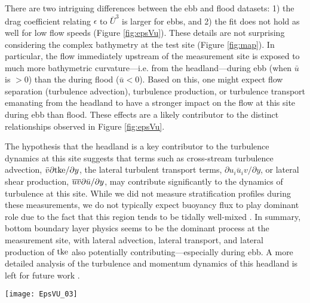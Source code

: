 There are two intriguing differences between the ebb and flood datasets: 1) the drag coefficient relating $\epsilon$ to $\bar{U}^3$ is larger for ebbs, and 2) the fit does not hold as well for low flow speeds (Figure \ref{fig:epsVu}). These details are not surprising considering the complex bathymetry at the test site (Figure \ref{fig:map}). In particular, the flow immediately upstream of the measurement site is exposed to much more bathymetric curvature---i.e. from the headland---during ebb (when $\bar{u}$ is $>0$) than the during flood ($\bar{u}<0$). Based on this, one might expect flow separation (turbulence advection), turbulence production, or turbulence transport emanating from the headland to have a stronger impact on the flow at this site during ebb than flood. These effects are a likely contributor to the distinct relationships observed in Figure \ref{fig:epsVu}. 

The hypothesis that the headland is a key contributor to the turbulence dynamics at this site suggests that terms such as cross-stream turbulence advection, $\bar{v}\partial \mathrm{tke} / \partial y$, the lateral turbulent transport terms, $\partial \overline{u_iu_i v} / \partial y$, or lateral shear production, $\overline{uv}\partial \bar{u} / \partial y$, may contribute significantly to the dynamics of turbulence at this site. While we did not measure stratification profiles during these measurements, we do not typically expect buoyancy flux to play dominant role due to the fact that this region tends to be tidally well-mixed \cite[]{Geyer+Cannon1982}. In summary, bottom boundary layer physics seems to be the dominant process at the measurement site, with lateral advection, lateral transport, and lateral production of $\mathrm{tke}$ also potentially contributing---especially during ebb. A more detailed analysis of the turbulence and momentum dynamics of this headland is left for future work \cite[e.g., ][]{Warner++2013}.

\begin{figure*}[t]
  \centering
  \texttt{[image: EpsVU\_03]}
  \caption{A log-log plot of $\epsilon$ vs. $\bar{U}$ for the June 2014 TTM (diamonds) and May 2015 SMB (dots) deployments, during ebb (left) and flood (right). Black points are 5-minute averages.  Green dots are mean values within speed bins of 0.2 m s$^{-1}$ width that have at least 10 points (50 minutes of data); their vertical bars are 95\% bootstrap confidence intervals. The blue line shows a $\bar U^3$ slope, wherein the proportionality constant (blue box) is calculated by taking the log-space mean of $\epsilon/\bar U^3$. }
  \label{fig:epsVu}
\end{figure*}



